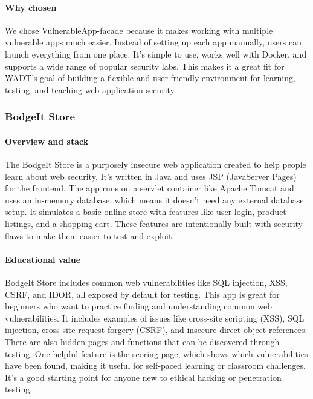 \documentclass[12pt]{article}
\begin{document}
\paragraph{Why chosen}
We chose VulnerableApp-facade because it makes working with multiple vulnerable apps much easier. Instead of setting up each app manually, users can launch everything from one place. It’s simple to use, works well with Docker, and supports a wide range of popular security labs. This makes it a great fit for WADT’s goal of building a flexible and user-friendly environment for learning, testing, and teaching web application security.

\subsubsection{BodgeIt Store}

\paragraph{Overview and stack}
The BodgeIt Store is a purposely insecure web application created to help people learn about web security. It’s written in Java and uses JSP (JavaServer Pages) for the frontend. The app runs on a servlet container like Apache Tomcat and uses an in-memory database, which means it doesn’t need any external database setup. It simulates a basic online store with features like user login, product listings, and a shopping cart. These features are intentionally built with security flaws to make them easier to test and exploit.

\paragraph{Educational value}
BodgeIt Store includes common web vulnerabilities like SQL injection, XSS, CSRF, and IDOR, all exposed by default for testing. This app is great for beginners who want to practice finding and understanding common web vulnerabilities. It includes examples of issues like cross-site scripting (XSS), SQL injection, cross-site request forgery (CSRF), and insecure direct object references. There are also hidden pages and functions that can be discovered through testing. One helpful feature is the scoring page, which shows which vulnerabilities have been found, making it useful for self-paced learning or classroom challenges. It’s a good starting point for anyone new to ethical hacking or penetration testing.
\end{document}
